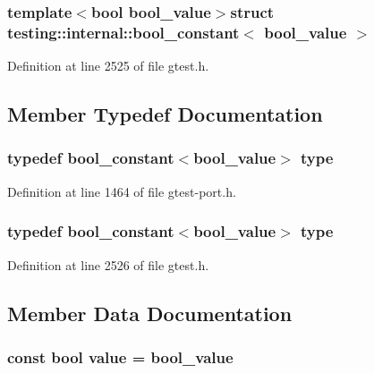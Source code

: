 \subsubsection*{template$<$bool bool\-\_\-value$>$struct testing\-::internal\-::bool\-\_\-constant$<$ bool\-\_\-value $>$}



\-Definition at line 2525 of file gtest.\-h.



\subsection{\-Member \-Typedef \-Documentation}
\hypertarget{structtesting_1_1internal_1_1bool__constant_a78018012842840cbf67b94799d759ef7}{
\subsubsection[{type}]{\setlength{\rightskip}{0pt plus 5cm}typedef {\bf bool\-\_\-constant}$<$bool\-\_\-value$>$ {\bf type}}}\label{d3/d75/structtesting_1_1internal_1_1bool__constant_a78018012842840cbf67b94799d759ef7}


\-Definition at line 1464 of file gtest-\/port.\-h.

\hypertarget{structtesting_1_1internal_1_1bool__constant_a78018012842840cbf67b94799d759ef7}{
\subsubsection[{type}]{\setlength{\rightskip}{0pt plus 5cm}typedef {\bf bool\-\_\-constant}$<$bool\-\_\-value$>$ {\bf type}}}\label{d3/d75/structtesting_1_1internal_1_1bool__constant_a78018012842840cbf67b94799d759ef7}


\-Definition at line 2526 of file gtest.\-h.



\subsection{\-Member \-Data \-Documentation}
\hypertarget{structtesting_1_1internal_1_1bool__constant_a11ddd051208250c32dc4985abcafa86d}{
\subsubsection[{value}]{\setlength{\rightskip}{0pt plus 5cm}const bool {\bf value} = bool\-\_\-value}}\label{d3/d75/structtesting_1_1internal_1_1bool__constant_a11ddd051208250c32dc4985abcafa86d}


